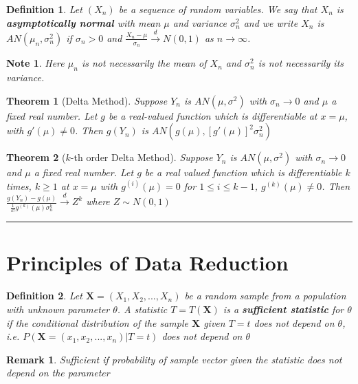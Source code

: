 \documentclass[14pt,twoside]{extreport}
\newcommand{\hhrule}{\vspace{1cm}\hrule\vspace{1cm}}
\theoremstyle{dotless}
\newtheorem*{defn}{\footnotesize Definition}
\newtheorem*{thm}{\footnotesize Theorem} %
\newtheorem*{note}{\footnotesize Note} %
\newtheorem*{remark}{\footnotesize Remark} %
\begin{document}
\begin{defn}
    Let $(X_n)$ be a sequence of random variables. We say that $X_n$ is \textbf{asymptotically normal} with mean $\mu$ and variance $\sigma_n^2$ and we write $X_n$ is $AN(\mu_n, \sigma_n^2)$ if $\sigma_n > 0$ and $\frac{X_n - \mu}{\sigma_n} \overset{d}{\to} N(0,1)$ as $n \to \infty$.
\end{defn}

\begin{note}
    Here $\mu_n$ is not necessarily the mean of $X_n$ and $\sigma_n^2$  is not necessarily its variance.
\end{note}

\begin{thm}[Delta Method]
    Suppose $Y_n$ is $AN(\mu, \sigma^2)$ with $\sigma_n \to 0$ and $\mu$ a fixed real number. 
    Let $g$ be a real-valued function which is differentiable at $x = \mu$, with $g'(\mu) \neq 0$. 
    Then $g(Y_n)$ is $AN(g(\mu), [g'(\mu)]^2 \sigma_n^2)$
\end{thm}

\begin{thm}[$k$-th order Delta Method]
    Suppose $Y_n$ is $AN(\mu, \sigma^2)$ with $\sigma_n \to 0$ and $\mu$ a fixed real number. 
    Let $g$ be a real valued function which is differentiable $k$ times, $k \geq 1$ at $x = \mu$ with $g^{(i)}(\mu) = 0$ for $1 \leq i \leq k - 1$, $g^{(k)}(\mu) \neq 0$. Then $\frac{g(Y_n) - g(\mu)}{\frac{1}{k!} g^{(k)}(\mu) \sigma_n^k} \overset{d}{\to} Z^k$ where $Z \sim N(0,1)$
\end{thm}

\hhrule

\section*{Principles of Data Reduction}

\begin{defn}
    Let $\bm{X} = (X_1, X_2, ..., X_n)$ be a random sample from a population with unknown parameter $\theta$. A statistic $T = T(\bm{X})$ is a \textbf{sufficient statistic} for $\theta$ if the conditional distribution of the sample $\bm{X}$ given $T = t$ does not depend on $\theta$, i.e. $P(\bm{X}=(x_1, x_2, ..., x_n) | T = t)$ does not depend on $\theta$
\end{defn}

\begin{remark}
    Sufficient if probability of sample vector given the statistic does not depend on the parameter
\end{remark}
\end{document}
